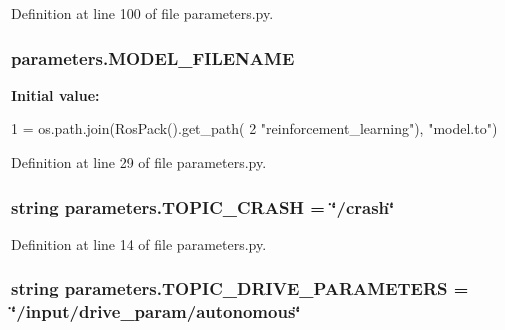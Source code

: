 Definition at line 100 of file parameters.\+py.

\subsubsection[{\texorpdfstring{M\+O\+D\+E\+L\+\_\+\+F\+I\+L\+E\+N\+A\+ME}{MODEL_FILENAME}}]{\setlength{\rightskip}{0pt plus 5cm}parameters.\+M\+O\+D\+E\+L\+\_\+\+F\+I\+L\+E\+N\+A\+ME}\hypertarget{namespaceparameters_aff8b0668384f3fa2d1212d3bd0ff42fa}{}\label{namespaceparameters_aff8b0668384f3fa2d1212d3bd0ff42fa}
{\bfseries Initial value\+:}
\begin{DoxyCode}
1 = os.path.join(RosPack().get\_path(
2     \textcolor{stringliteral}{"reinforcement\_learning"}), \textcolor{stringliteral}{"model.to"})
\end{DoxyCode}


Definition at line 29 of file parameters.\+py.

\subsubsection[{\texorpdfstring{T\+O\+P\+I\+C\+\_\+\+C\+R\+A\+SH}{TOPIC_CRASH}}]{\setlength{\rightskip}{0pt plus 5cm}string parameters.\+T\+O\+P\+I\+C\+\_\+\+C\+R\+A\+SH = \char`\"{}/crash\char`\"{}}\hypertarget{namespaceparameters_a5e392ed4d998f10824bfd96a0eae2988}{}\label{namespaceparameters_a5e392ed4d998f10824bfd96a0eae2988}


Definition at line 14 of file parameters.\+py.

\subsubsection[{\texorpdfstring{T\+O\+P\+I\+C\+\_\+\+D\+R\+I\+V\+E\+\_\+\+P\+A\+R\+A\+M\+E\+T\+E\+RS}{TOPIC_DRIVE_PARAMETERS}}]{\setlength{\rightskip}{0pt plus 5cm}string parameters.\+T\+O\+P\+I\+C\+\_\+\+D\+R\+I\+V\+E\+\_\+\+P\+A\+R\+A\+M\+E\+T\+E\+RS = \char`\"{}/input/drive\+\_\+param/autonomous\char`\"{}}\hypertarget{namespaceparameters_a855cb11de60782b8e9997af80bdab518}{}\label{namespaceparameters_a855cb11de60782b8e9997af80bdab518}


